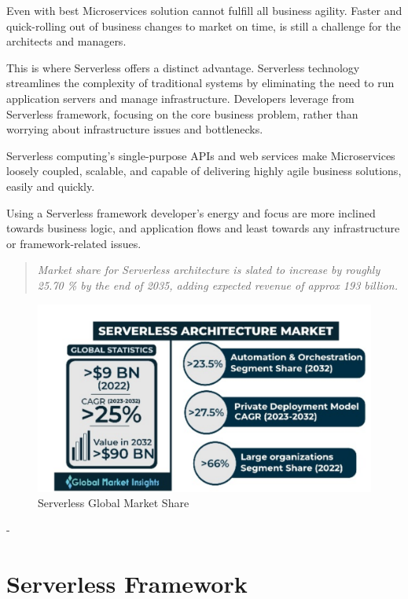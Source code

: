 \documentclass[12pt]{article}
\begin{document}
\begin{flushleft}
Even with best Microservices solution cannot fulfill all business agility. Faster and quick-rolling out of business changes to market on time, is still a challenge for the architects and managers. 

This is where Serverless offers a distinct advantage. Serverless technology streamlines the complexity of traditional systems by eliminating the need to run application servers and manage infrastructure. Developers leverage from Serverless framework, focusing on the core business problem, rather than worrying about infrastructure issues and bottlenecks.

Serverless computing's single-purpose APIs and web services make Microservices loosely coupled, scalable, and capable of delivering highly agile business solutions, easily and quickly.

Using a Serverless framework developer’s energy and focus are more inclined towards business logic, and application flows and least towards any infrastructure or framework-related issues.

\begin{quote}
   \textit{Market share for Serverless architecture is slated to increase by roughly 25.70 \% by the end of 2035, adding expected revenue of approx 193 billion. }
\end{quote}

\begin{figure}[h]
    \centering
    \includegraphics[width=0.5\linewidth]{images/Serverless-Arch-market.PNG}
    \caption{Serverless Global Market Share}
\end{figure}
\begin{flushright}
    - \cite{Global_Market_Insights_ID_GMI3796_2022}
\end{flushright}
\end{flushleft}
\pagebreak

\section{Serverless Framework}
\end{document}
